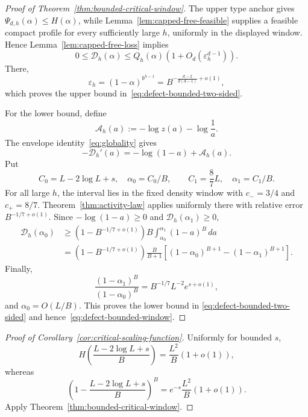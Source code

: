 \documentclass[11pt]{amsart}
\theoremstyle{definition}
\newcommand{\Dcal}{\mathcal D}
\begin{document}
\begin{proof}[Proof of Theorem~\ref{thm:bounded-critical-window}]
The upper type anchor gives $\Psi_{d,h}(\alpha)\le H(\alpha)$, while
Lemma~\ref{lem:capped-free-feasible} supplies a feasible compact profile for every sufficiently large $h$, uniformly in the displayed window.  Hence Lemma~\ref{lem:capped-free-loss} implies
\[
 0\le \Dcal_h(\alpha)
 \le Q_h(\alpha)
 \left(1+O_d(\varepsilon_h^{d-1})\right).
\]
There,
\[
 \varepsilon_h=(1-\alpha)^{b^{h-1}}
 =B^{-\frac{d-2}{d(d-1)}+o(1)},
\]
which proves the upper bound in~\eqref{eq:defect-bounded-two-sided}.

For the lower bound, define
\[
 \mathcal A_h(a)
 :=-\log z(a)-\log\frac1a.
\]
The envelope identity~\eqref{eq:globality} gives
\begin{equation}\label{eq:defect-derivative}
 -\Dcal_h'(a)=-\log(1-a)+\mathcal A_h(a).
\end{equation}
Put
\[
 C_0=L-2\log L+s,
 \quad \alpha_0=C_0/B,
 \qquad
 C_1=\frac87L,
 \quad \alpha_1=C_1/B.
\]
For all large $h$, the interval lies in the fixed density window with
$c_-=3/4$ and $c_+=8/7$.  Theorem~\ref{thm:activity-law} applies uniformly there with relative error $B^{-1/7+o(1)}$.  Since
$-\log(1-a)\ge0$ and $\Dcal_h(\alpha_1)\ge0$,
\begin{align*}
 \Dcal_h(\alpha_0)
 &\ge
 \left(1-B^{-1/7+o(1)}\right)
 B\int_{\alpha_0}^{\alpha_1}(1-a)^B\,da\\
 &=\left(1-B^{-1/7+o(1)}\right)
 \frac{B}{B+1}
 \left[(1-\alpha_0)^{B+1}-(1-\alpha_1)^{B+1}\right].
\end{align*}
Finally,
\[
 \frac{(1-\alpha_1)^B}{(1-\alpha_0)^B}
 =B^{-1/7}L^{-2}e^{s+o(1)},
\]
and $\alpha_0=O(L/B)$.  This proves the lower bound in
\eqref{eq:defect-bounded-two-sided} and hence~\eqref{eq:defect-bounded-window}.
\end{proof}

\begin{proof}[Proof of Corollary~\ref{cor:critical-scaling-function}]
Uniformly for bounded $s$,
\[
 H\!\left(\frac{L-2\log L+s}{B}\right)
 =\frac{L^2}{B}(1+o(1)),
\]
whereas
\[
 \left(1-\frac{L-2\log L+s}{B}\right)^B
 =e^{-s}\frac{L^2}{B}(1+o(1)).
\]
Apply Theorem~\ref{thm:bounded-critical-window}.
\end{proof}
\end{document}

